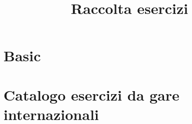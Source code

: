 \documentclass[a4paper,10pt]{article}
\title{Raccolta esercizi}
\author{}
\begin{document}
\maketitle

\section{Basic}

\section{Catalogo esercizi da gare internazionali}
\end{document}
